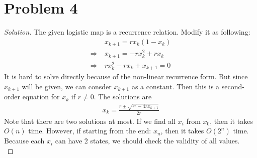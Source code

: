 \section*{Problem 4}
	\begin{proof} [Solution]
		The given logistic map is a recurrence relation. Modify it as following:
		\begin{align*}
			& x_{k+1} = rx_k(1 - x_k)\\
			\Rightarrow\ &x_{k+1} = -rx_k^2 + rx_k\\
			\Rightarrow\ &rx_k^2 - rx_k + x_{k+1} = 0
		\end{align*}
		It is hard to solve directly because of the non-linear recurrence form. But since $x_{k+1}$ will be given, we can consder $x_{k+1}$ as a constant. Then this is a second-order equation for $x_k$ if $r \neq 0$. The solutions are
		\begin{align*}
			x_k = \frac{r \pm \sqrt{r^2 - 4rx_{k+1}}}{2r}
		\end{align*}
		Note that there are two solutions at most. If we find all $x_i$ from $x_0$, then it takes $O(n)$ time. However, if starting from the end: $x_n$, then it takes $O(2^n)$ time. Because each $x_i$ can have 2 states, we should check the validity of all values.\\
	\end{proof}